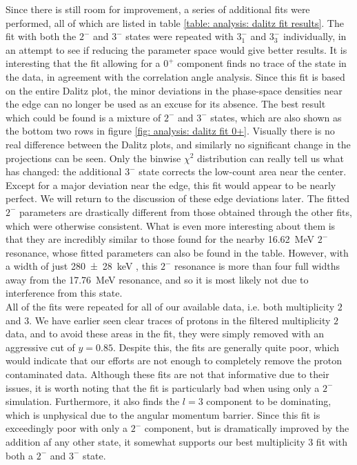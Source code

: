 Since there is still room for improvement, a series of additional fits were performed, all of which are listed in table \ref{table: analysis: dalitz fit results}. The fit with both the $2^-$ and $3^-$ states were repeated with $3^-_1$ and $3^-_3$ individually, in an attempt to see if reducing the parameter space would give better results. It is interesting that the fit allowing for a $0^+$ component finds no trace of the state in the data, in agreement with the correlation angle analysis. Since this fit is based on the entire Dalitz plot, the minor deviations in the phase-space densities near the edge can no longer be used as an excuse for its absence. The best result which could be found is a mixture of $2^-$ and $3^-$ states, which are also shown as the bottom two rows in figure \ref{fig: analysis: dalitz fit 0+}. Visually there is no real difference between the Dalitz plots, and similarly no significant change in the projections can be seen. Only the binwise $\chi^2$ distribution can really tell us what has changed: the additional $3^-$ state corrects the low-count area near the center. Except for a major deviation near the edge, this fit would appear to be nearly perfect. We will return to the discussion of these edge deviations later. The fitted $2^-$ parameters are drastically different from those obtained through the other fits, which were otherwise consistent. What is even more interesting about them is that they are incredibly similar to those found for the nearby \SI{16.62}{MeV} $2^-$ resonance, whose fitted parameters can also be found in the table. However, with a width of just \SI{280(28)}{keV} \cite{nudat}, this $2^-$ resonance is more than four full widths away from the \SI{17.76}{MeV} resonance, and so it is most likely not due to interference from this state. \\

All of the fits were repeated for all of our available data, i.e. both multiplicity $2$ and $3$. We have earlier seen clear traces of protons in the filtered multiplicity $2$ data, and to avoid these areas in the fit, they were simply removed with an aggressive cut of $y=0.85$. Despite this, the fits are generally quite poor, which would indicate that our efforts are not enough to completely remove the proton contaminated data. Although these fits are not that informative due to their issues, it is worth noting that the fit is particularly bad when using only a $2^-$ simulation. Furthermore, it also finds the $l=3$ component to be dominating, which is unphysical due to the angular momentum barrier. Since this fit is exceedingly poor with only a $2^-$ component, but is dramatically improved by the addition af any other state, it somewhat supports our best multiplicity $3$ fit with both a $2^-$ and $3^-$ state. 

